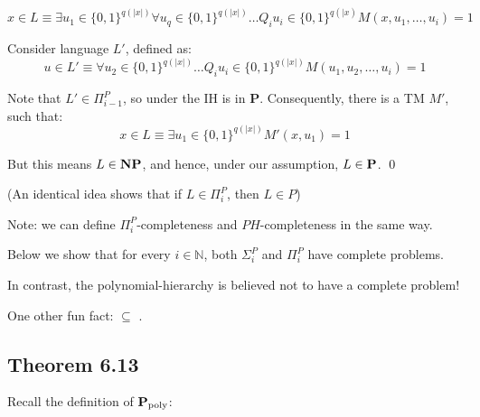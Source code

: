 \documentclass[11pt]{article} %
\begin{document}
\begin{equation*}
x \in L \equiv \exists u_1 \in \{0,1\}^{q(|x|)} \forall u_q \in \{0,1\}^{q(|x|)} \ldots Q_i u_i \in \{0,1\}^{q(|x)} M(x, u_1, \ldots, u_i) = 1
\end{equation*}

Consider language $L'$, defined as:
\begin{equation*}
u \in L' \equiv \forall u_2 \in \{0,1\}^{q(|x|)} \ldots Q_i u_i \in \{0,1\}^{q(|x|)} M(u_1,u_2,\ldots,u_i) = 1
\end{equation*}

Note that $L' \in \Pi_{i-1}^P$, so under the IH is in {\bf P}. Consequently, there is a TM $M'$, such that:
\begin{equation*}
x \in L \equiv \exists u_1 \in \{0,1\}^{q(|x|)} M'(x,u_1) = 1
\end{equation*}

But this means $L \in \text{{\bf NP}}$, and hence, under our assumption, $L \in \text{{\bf P}}$. \qed

(An identical idea shows that if $L \in \Pi_i^P$, then $L \in P$)

\midline


Note: we can define $\Pi_i^P$-completeness and $PH$-completeness in the same way.

Below we show that for every $i \in \mathbb{N}$, both $\Sigma_i^P$ and $\Pi_i^P$ have complete problems.

In contrast, the polynomial-hierarchy is believed not to have a complete problem! 


One other fun fact:  $\subseteq$ .

\midline

\subsection{Theorem 6.13}
Recall the definition of $\text{{\bf P}}_\text{poly}$: 

\end{document}
